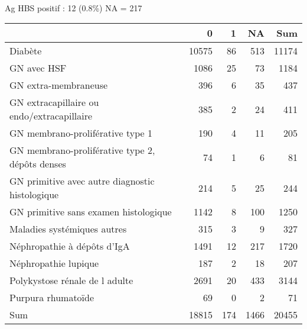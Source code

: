 \documentclass[11pt,a4paper]{article}\usepackage[]{graphicx}\usepackage[]{color}
\begin{document}
~\\

Ag HBS positif : 12 (0.8\%) NA = 217

\begin{table}[H]
\centering
\begin{tabular}{lrrrr}
  \hline
 & 0 & 1 & NA & Sum \\ 
  \hline
Diabète & 10575 & 86 & 513 & 11174 \\ 
  GN avec HSF & 1086 & 25 & 73 & 1184 \\ 
  GN extra-membraneuse & 396 & 6 & 35 & 437 \\ 
  GN extracapillaire ou endo/extracapillaire & 385 & 2 & 24 & 411 \\ 
  GN membrano-proliférative type 1 & 190 & 4 & 11 & 205 \\ 
  GN membrano-proliférative type 2, dépôts denses & 74 & 1 & 6 & 81 \\ 
  GN primitive avec autre diagnostic histologique & 214 & 5 & 25 & 244 \\ 
  GN primitive sans examen histologique & 1142 & 8 & 100 & 1250 \\ 
  Maladies systémiques autres & 315 & 3 & 9 & 327 \\ 
  Néphropathie à dépôts d'IgA & 1491 & 12 & 217 & 1720 \\ 
  Néphropathie lupique & 187 & 2 & 18 & 207 \\ 
  Polykystose rénale de l adulte & 2691 & 20 & 433 & 3144 \\ 
  Purpura rhumatoïde & 69 & 0 & 2 & 71 \\ 
  Sum & 18815 & 174 & 1466 & 20455 \\ 
   \hline
\end{tabular}
\end{table}
\end{document}
